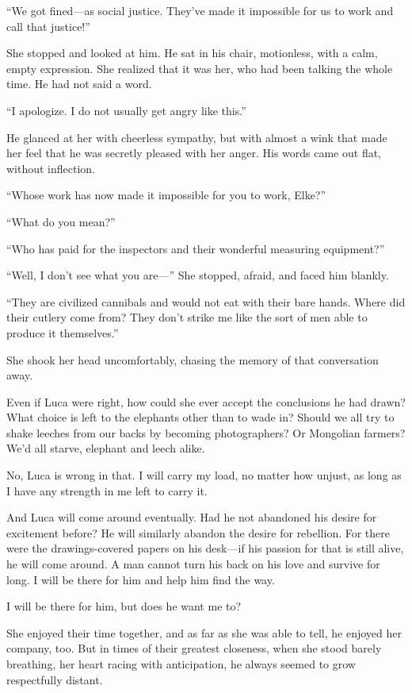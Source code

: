 ``We got fined---as social justice. They've made it impossible for us to work and call that justice!''

She stopped and looked at him. He sat in his chair, motionless, with a calm, empty expression. She realized that it was her, who had been talking the whole time. He had not said a word.

``I apologize. I do not usually get angry like this.''

He glanced at her with cheerless sympathy, but with almost a wink that made her feel that he was secretly pleased with her anger. His words came out flat, without inflection.

``Whose work has now made it impossible for you to work, Elke?''

``What do you mean?''

``Who has paid for the inspectors and their wonderful measuring equipment?''

``Well, I don't see what you are---'' She stopped, afraid, and faced him blankly.

``They are civilized cannibals and would not eat with their bare hands. Where did their cutlery come from? They don't strike me like the sort of men able to produce it themselves.''

She shook her head uncomfortably, chasing the memory of that conversation away.

Even if Luca were right, how could she ever accept the conclusions he had drawn? What choice is left to the elephants other than to wade in? Should we all try to shake leeches from our backs by becoming photographers? Or Mongolian farmers? We'd all starve, elephant and leech alike.

No, Luca is wrong in that. I will carry my load, no matter how unjust, as long as I have any strength in me left to carry it.

And Luca will come around eventually. Had he not abandoned his desire for excitement before? He will similarly abandon the desire for rebellion. For there were the drawings-covered papers on his desk---if his passion for that is still alive, he will come around. A man cannot turn his back on his love and survive for long. I will be there for him and help him find the way.

I will be there for him, but does he want me to?

She enjoyed their time together, and as far as she was able to tell, he enjoyed her company, too. But in times of their greatest closeness, when she stood barely breathing, her heart racing with anticipation, he always seemed to grow respectfully distant.

